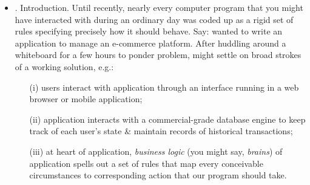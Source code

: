 \documentclass{article}
\begin{document}
\begin{enumerate}
\begin{itemize}
\begin{itemize}
			Can install PyTorch (specified versions are tested at time of writing) with either CPU or GPU support as follows:
			\begin{verbatim}
				pip install torch==2.0.0 torchvision==0.15.1
			\end{verbatim}
			Next step: to install {\tt d2l} package developed in order to encapsulate frequently used functions \& classes found throughout this book:
			\begin{verbatim}
				pip install d2l==1.0.3
			\end{verbatim}
			\item {\bf Downloading \& Running Code.} Download notebooks so that can run each of book's code blocks. Simply click on ``Notebooks'' tab at top of any HTML page on \url{https://d2l.ai/} to download code \& then unzip it. Alternatively, can fetch notebooks from command line as follows:
			\begin{verbatim}
				mkdir d2l-en && cd d2l-en
				curl https://d2l.ai/d2l-en-1.0.3.zip -o d2l-en.zip
				unzip d2l-en.zip && rm d2l-en.zip
				cd pytorch
			\end{verbatim}
			{\tt SKIP INSTALLATION STEPS}
		\end{itemize}
		\item {. Introduction.} Until recently, nearly every computer program that you might have interacted with during an ordinary day was coded up as a rigid set of rules specifying precisely how it should behave. Say: wanted to write an application to manage an e-commerce platform. After huddling around a whiteboard for a few hours to ponder problem, might settle on broad strokes of a working solution, e.g.:
		\begin{itemize}
			\item[(i)] users interact with application through an interface running in a web browser or mobile application;
			\item[(ii)] application interacts with a commercial-grade database engine to keep track of each user's state \& maintain records of historical transactions;
			\item[(iii)] at heart of application, {\it business logic} (you might say, {\it brains}) of application spells out a set of rules that map every conceivable circumstances to corresponding action that our program should take.
		\end{itemize}

\end{itemize}
\end{enumerate}
\end{document}

